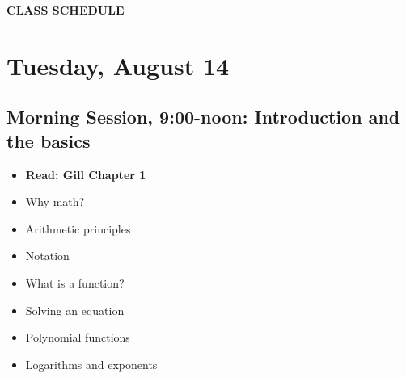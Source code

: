 \documentclass[12pt,a4paper]{article}
\begin{document}



\clearpage
\textbf{CLASS SCHEDULE}\\

\section*{Tuesday, August 14}
\subsection*{Morning Session, 9:00-noon: Introduction and the basics}
\begin{itemize}
\setlength{\itemsep}{0pt}
\footnotesize
\item \textbf{Read: Gill Chapter 1}
\item Why math?
\item Arithmetic principles
\item Notation
\item What is a function?
\item Solving an equation
\item Polynomial functions
\item Logarithms and exponents
\end{itemize}
\end{document}
